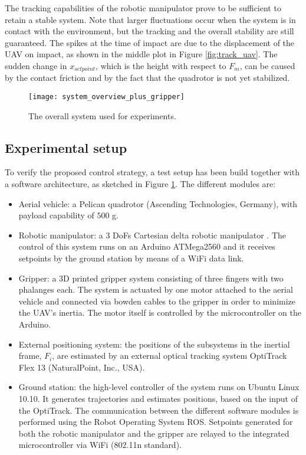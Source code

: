 \documentclass[a4paper, 10pt, conference]{ieeeconf}
\begin{document}
The tracking
capabilities of the robotic manipulator prove to be sufficient to retain a
stable system. Note that larger fluctuations occur when the system is
in contact with the environment, but the tracking and the overall
stability are still guaranteed. The spikes at the time of impact are
due to the displacement of the UAV on impact, as shown in the middle
plot in Figure \ref{fig:track_uav}. The sudden change in
$x_\textit{setpoint}$, which is the height with respect to $F_m$, can
be caused by the contact friction and by the fact that the quadrotor
is not yet stabilized.

\begin{figure}[t]
  \centering
  \texttt{[image: system\_overview\_plus\_gripper]}
  \caption{The overall system used for experiments.}
  \label{fig:total_scheme}
\end{figure}

\subsection{Experimental setup}
To verify the proposed control strategy, a test setup has
been build together with a software architecture, as sketched in 
Figure \ref{fig:total_scheme}. The different modules are:
\begin{itemize}
\item Aerial vehicle: a Pelican quadrotor (Ascending Technologies, Germany), with  payload capability of $500$ g.
\item Robotic manipulator: a $3$ DoFs Cartesian delta robotic
  manipulator \cite{keemink2012}. The control of this
  system runs on an Arduino ATMega2560
  and it receives setpoints by the ground station by means of a WiFi
  data link.
\item Gripper: a 3D printed gripper system consisting of three fingers
  with two phalanges each. The system is actuated by one motor
  attached to the aerial vehicle and connected via bowden cables to
  the gripper in order to minimize the UAV's inertia. The motor itself
  is controlled by the microcontroller on the Arduino.
\item External positioning system: the positions of the subsystems in
  the inertial frame, $F_i$, are estimated by an external optical
  tracking system OptiTrack Flex 13 (NaturalPoint, Inc., USA).%
\item Ground station: the high-level controller of the system runs on Ubuntu Linux 10.10. It generates trajectories and estimates positions, based on the input of
  the OptiTrack. The communication
  between the different software modules is performed using the Robot
  Operating System ROS. Setpoints generated for
  both the robotic manipulator and the gripper are relayed to the
  integrated microcontroller via WiFi (802.11n
  standard).
\end{itemize}
\end{document}
